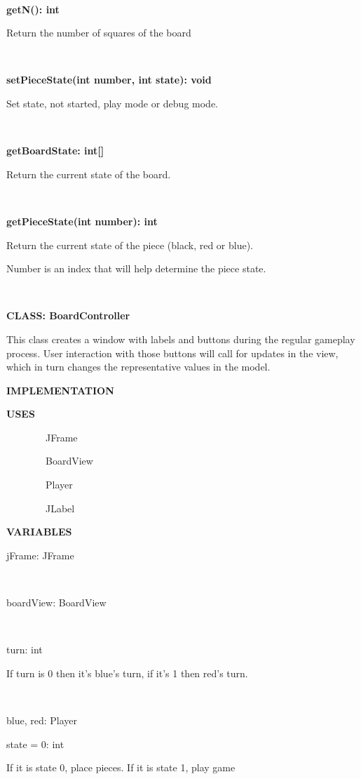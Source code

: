 \documentclass{article}
\begin{document}
{{~}

{\textbf{getN(): int}}

{Return the }{number of squares of the board}

{~}

{\textbf{setPieceState(int number, int state): void}}

{Set state, not started, play mode or debug mode.}

{~}

{\textbf{getBoardState: int{[}{]}}}

{Return the current state of the board}{.}

{~}

{\textbf{getPieceState(int number): int}}

{Return the current state of the piece (black, red or blue).}

{Number is an index that will help determine the piece state}{.}

{}

{}

{~~~~~~~~}

{}

{\textbf{CLASS: BoardController}}

{This class creates a window with labels and buttons during the regular gameplay process. User interaction with those buttons will call for updates in the view, which in turn changes the representative values in the model.}

{\textbf{IMPLEMENTATION}}

{\textbf{USES}}

{~~~~~~~~JFrame}

{~~~~~~~~BoardView}

{~~~~~~~~Player}

{~~~~~~~~JLabel}

{\textbf{VARIABLES}}

{jFrame: JFrame}

{~~~~~~~~}

{boardView: BoardView}

{~~~~~~~~}

{turn: int}

{If turn is 0 then it's blue's turn, if it's 1 then red's turn.}

{~~~~~~~~}

{blue, red: Player}

{}

{state = 0: int}

{If it is state 0, place pieces. If it is state 1, play game}

}
\end{document}
